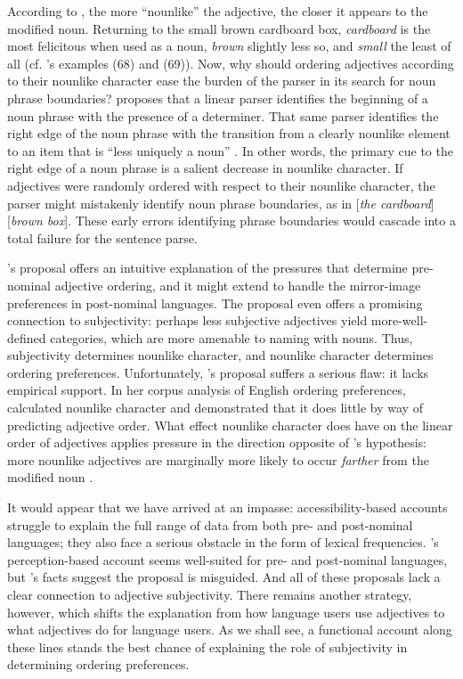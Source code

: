 \documentclass{sp}
\begin{document}
According to \citeauthor{bever1970}, the more ``nounlike'' the adjective, the closer it appears to the modified noun. %
Returning to the small brown cardboard box, \emph{cardboard} is the most felicitous when used as a noun, \emph{brown} slightly less so, and \emph{small} the least of all (cf. \citeauthor{bever1970}'s examples (68) and (69)). 
Now, why should ordering adjectives according to their nounlike character ease the burden of the parser in its search for noun phrase boundaries? \citeauthor{bever1970} proposes that a linear parser identifies the beginning of a noun phrase with the presence of a determiner. That same parser identifies the right edge of the noun phrase with the transition from a clearly nounlike element to an item that is ``less uniquely a noun'' . In other words, the primary cue to the right edge of a noun phrase is a salient decrease in nounlike character. If adjectives were randomly ordered with respect to their nounlike character, the parser might mistakenly identify noun phrase boundaries, as in [\emph{the cardboard}] [\emph{brown box}]. These early errors identifying phrase boundaries would cascade into a total failure for the sentence parse.

\citeauthor{bever1970}'s proposal offers an intuitive explanation of the pressures that determine pre-nominal adjective ordering, and it might extend to handle the mirror-image preferences in post-nominal languages. The proposal even offers a promising connection to subjectivity: perhaps less subjective adjectives yield more-well-defined categories, which are more amenable to naming with nouns. Thus, subjectivity determines nounlike character, and nounlike character determines ordering preferences. Unfortunately, \citeauthor{bever1970}'s proposal suffers a serious flaw: it lacks empirical support. In her corpus analysis of English ordering preferences, \cite{wulff2003} %
calculated nounlike character and demonstrated that it does little by way of predicting adjective order. What effect nounlike character does have on the linear order of adjectives applies pressure in the direction opposite of \citeauthor{bever1970}'s hypothesis: more nounlike adjectives are marginally more likely to occur \emph{farther} from the modified noun .

It would appear that we have arrived at an impasse: accessibility-based accounts struggle to explain the full range of data from both pre- and post-nominal languages; they also face a serious obstacle in the form of lexical frequencies. \citeauthor{bever1970}'s perception-based account seems well-suited for pre- and post-nominal languages, but \citeauthor{wulff2003}'s facts suggest the proposal is misguided. And all of these proposals lack a clear connection to adjective subjectivity. There remains another strategy, however, which shifts the explanation from how language users use adjectives to what adjectives do for language users. As we shall see, a functional account along these lines stands the best chance of explaining the role of subjectivity in determining ordering preferences.
\end{document}
